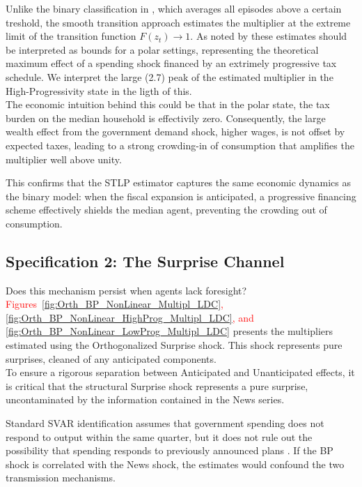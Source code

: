 \documentclass[12pt,letterpaper]{article}
\begin{document}
Unlike the binary classification in \cite{FN}, which averages all episodes above a certain treshold, the smooth transition approach estimates the multiplier at the extreme limit of the transition function $F(z_t) \xrightarrow{}1$.
As noted by \cite{Auerbach_Gorodnichenko_2012_Measuring} these estimates should be interpreted as bounds for a polar settings, representing the theoretical maximum effect of a spending shock financed by an extrimely progressive tax schedule. We interpret the large (2.7) peak of the estimated multiplier in the High-Progressivity state in the ligth of this.
\\
The economic intuition behind this could be that in the polar state, the tax burden on the median household is effectivily zero.
Consequently, the large wealth effect from the government demand shock, higher wages, is not offset by expected taxes, leading to a strong crowding-in of consumption that amplifies the multiplier well above unity. 

This confirms that the STLP estimator captures the same economic dynamics as the \cite{FN} binary model: when the fiscal expansion is anticipated, a progressive financing scheme effectively shields the median agent, preventing the crowding out of consumption.

\subsection{Specification 2: The Surprise Channel}
Does this mechanism persist when agents lack foresight? \textcolor{red}{Figures~\ref{fig:Orth_BP_NonLinear_Multipl_LDC},
\ref{fig:Orth_BP_NonLinear_HighProg_Multipl_LDC}, and \ref{fig:Orth_BP_NonLinear_LowProg_Multipl_LDC} } presents the multipliers estimated using the Orthogonalized Surprise \cite{BP} shock. This shock represents pure surprises, cleaned of any anticipated components.
\\
To ensure a rigorous separation between Anticipated and Unanticipated effects, it is critical that the structural Surprise shock \cite{BP} represents a pure surprise, uncontaminated by the information contained in the News series.

Standard SVAR identification assumes that government spending does not respond to output within the same quarter, but it does not rule out the possibility that spending responds to previously announced plans \citep{Ramey2011}. If the BP shock is correlated with the News shock, the estimates would confound the two transmission mechanisms.
\end{document}
